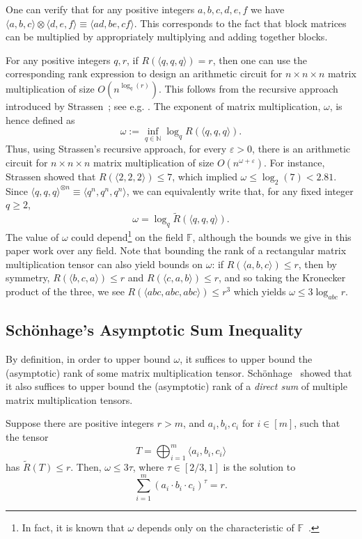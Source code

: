 \documentclass{theoretics}
\newcommand{\F}{\mathbb{F}}
\newcommand{\eps}{\varepsilon}
\begin{document}
One can verify that for any positive integers $a,b,c,d,e,f$ we have $\langle a,b,c \rangle \otimes \langle d,e,f \rangle \equiv \langle ad, be, cf \rangle$. This corresponds to the fact that block matrices can be multiplied by appropriately multiplying and adding together blocks.

For any positive integers $q,r$, if $R(\langle q,q,q \rangle) = r$, then one can use the corresponding rank expression to design an arithmetic circuit for $n \times n \times n$ matrix multiplication of size $O(n^{\log_q(r)})$. This follows from the recursive approach introduced by Strassen~\cite{strassen}; see e.g. \cite[Proposition~1.1, Theorem~5.2]{blaser}. The exponent of matrix multiplication, $\omega$, is hence defined as $$\omega := \inf_{q \in \mathbb{N}} \log_q R(\langle q,q,q \rangle).$$ Thus, using Strassen's recursive approach, for every $\eps>0$, there is an arithmetic circuit for $n \times n \times n$ matrix multiplication of size $O(n^{\omega + \eps})$. For instance, Strassen showed that $R(\langle 2,2,2 \rangle) \leq 7$, which implied $\omega \leq \log_2(7) < 2.81$. Since $\langle q,q,q \rangle^{\otimes n} \equiv \langle q^n,q^n,q^n \rangle$, we can equivalently write that, for any fixed integer $q \geq 2$, $$\omega = \log_q \tilde{R}(\langle q,q,q \rangle).$$
The value of $\omega$ could depend\footnote{In fact, it is known that $\omega$ depends only on the characteristic of $\F$~\cite{Sch81}.} on the field $\F$, although the bounds we give in this paper work over any field. Note that bounding the rank of a rectangular matrix multiplication tensor can also yield bounds on $\omega$: if $R(\langle a,b,c \rangle) \leq r$, then by symmetry, $R(\langle b,c,a \rangle) \leq r$ and $R(\langle c,a,b \rangle) \leq r$, and so taking the Kronecker product of the three, we see $R(\langle abc,abc,abc \rangle) \leq r^3$ which yields $\omega \leq 3 \log_{abc} r$.

\subsection{Sch{\"o}nhage's Asymptotic Sum Inequality}

By definition, in order to upper bound $\omega$, it suffices to upper bound the (asymptotic) rank of some matrix multiplication tensor. Sch{\"o}nhage~\cite{Sch81} showed that it also suffices to upper bound the (asymptotic) rank of a \emph{direct sum} of multiple matrix multiplication tensors.

\begin{theorem}\label{thm:schonhage}
Suppose there are positive integers $r>m$, and $a_i,b_i,c_i$ for $i \in [m]$, such that the tensor $$T = \bigoplus_{i=1}^m \langle a_i,b_i,c_i \rangle$$ has $\tilde{R}(T) \leq r$. Then, $\omega \leq 3 \tau$, where $\tau \in [2/3,1]$ is the solution to $$\sum_{i=1}^m (a_i \cdot b_i \cdot c_i)^\tau = r.$$
\end{theorem}
\end{document}
